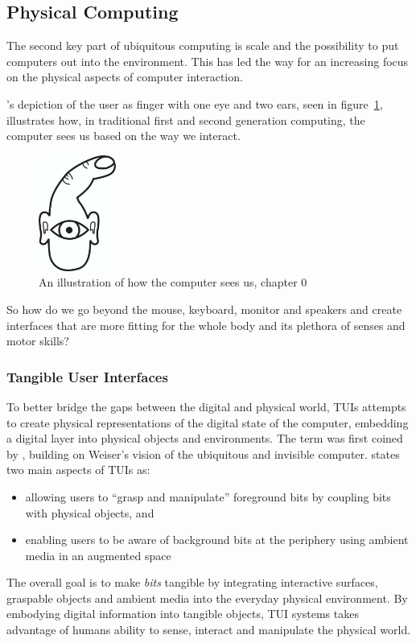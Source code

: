 \subsection{Physical Computing}
The second key part of ubiquitous computing is scale and the possibility to put computers out into the environment.
This has led the way for an increasing focus on the physical aspects of computer interaction.

\citet{o2004physical}'s depiction of the user as finger with one eye and two ears, seen in figure~\ref{finger-eye}, illustrates how, in traditional first and second generation computing, the computer sees us based on the way we interact. 

\begin{figure}[h]
  \centering
      \includegraphics[height=1.5in]{figures/igoefinger}
  \caption[An illustration of how the computer sees us, chapter 0 \citep{o2004physical}]
   {An illustration of how the computer sees us, chapter 0 \citep{o2004physical}}
   \label{finger-eye}
\end{figure}
So how do we go beyond the mouse, keyboard, monitor and speakers and create interfaces that are more fitting for the whole body and its plethora of senses and motor skills? 

\subsubsection{Tangible User Interfaces}
To better bridge the gaps between the digital and physical world, TUIs attempts to create physical representations of the digital state of the computer, embedding a digital layer into physical objects and environments.
The term was first coined by \citet{ishii1997tangible}, building on Weiser's vision of the ubiquitous and invisible computer.
\citeauthor{ishii1997tangible} states two main aspects of TUIs as:
\begin{itemize}
    \item{allowing users to ``grasp and manipulate'' foreground bits by coupling bits with physical objects, and}
    \item{enabling users to be aware of background bits at the periphery using ambient media in an augmented space}
\end{itemize}
The overall goal is to make \emph{bits} tangible by integrating interactive surfaces, graspable objects and ambient media into the everyday physical environment.
By embodying digital information into tangible objects, TUI systems takes advantage of humans ability to sense, interact and manipulate the physical world. 

